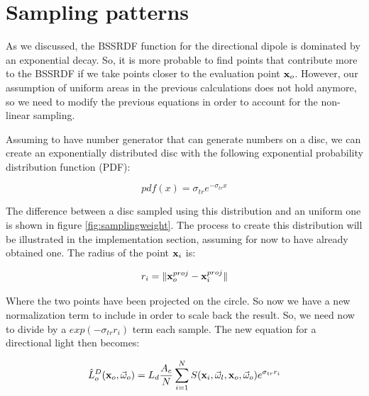 \section{Sampling patterns}
As we discussed, the BSSRDF function for the directional dipole is dominated by an exponential decay. So, it is more probable to find points that contribute more to the BSSRDF if we take points closer to the evaluation point $\mathbf{x}_o$. However, our assumption of uniform areas in the previous calculations does not hold anymore, so we need to modify the previous equations in order to account for the non-linear sampling.

Assuming to have number generator that can generate numbers on a disc, we can create an exponentially distributed disc with the following exponential probability distribution function (PDF):

$$
pdf(x) = \sigma_{tr} e^{-\sigma_{tr} x}
$$

The difference between a disc sampled using this distribution and an uniform one is shown in figure \ref{fig:samplingweight}. The process to create this distribution will be illustrated in the implementation section, assuming for now to have already obtained one. The radius of the point $\mathbf{x}_i$ is: 

$$
r_i = \|\mathbf{x}_o^{proj} - \mathbf{x}_i^{proj}\|
$$

Where the two points have been projected on the circle. So now we have a new normalization term to include in order to scale back the result. So, we need now to divide by a $exp(-\sigma_{tr} r_i)$ term each sample. The new equation for a directional light then becomes:

$$
\hat{L}_o^D(\mathbf{x}_o,\vec{\omega}_o) = L_d \frac{A_c}{N} \sum_{i = 1}^N S(\mathbf{x}_i, \vec{\omega}_l, \mathbf{x}_o, \vec{\omega}_o) e^{\sigma_{tr} r_i}
$$

